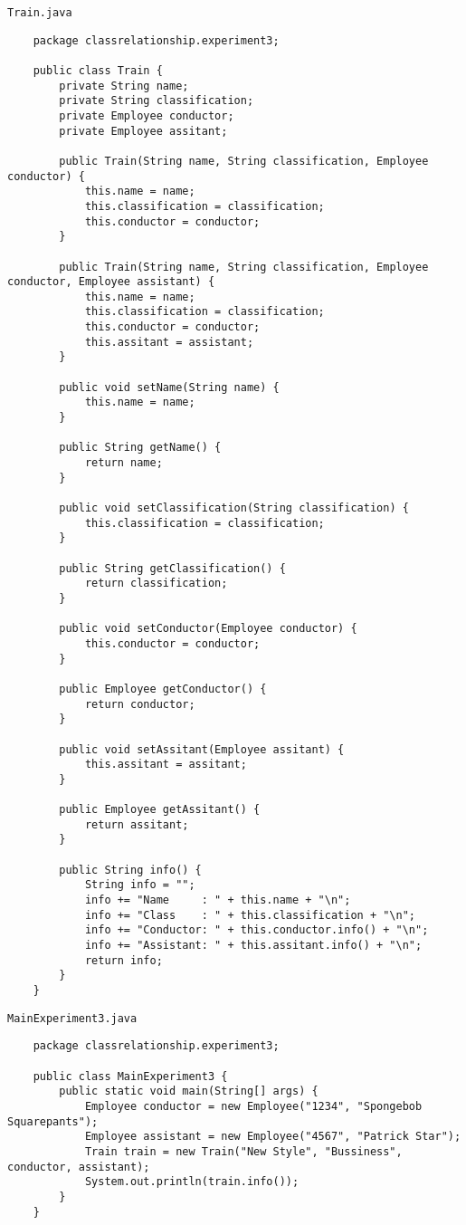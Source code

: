 \documentclass[12pt,titlepage]{article}
\begin{document}
\newpage
\noindent \texttt{Train.java}
\begin{verbatim}
    package classrelationship.experiment3;

    public class Train {
        private String name;
        private String classification;
        private Employee conductor;
        private Employee assitant;

        public Train(String name, String classification, Employee conductor) {
            this.name = name;
            this.classification = classification;
            this.conductor = conductor;
        }

        public Train(String name, String classification, Employee conductor, Employee assistant) {
            this.name = name;
            this.classification = classification;
            this.conductor = conductor;
            this.assitant = assistant;
        }

        public void setName(String name) {
            this.name = name;
        }

        public String getName() {
            return name;
        }

        public void setClassification(String classification) {
            this.classification = classification;
        }

        public String getClassification() {
            return classification;
        }

        public void setConductor(Employee conductor) {
            this.conductor = conductor;
        }

        public Employee getConductor() {
            return conductor;
        }

        public void setAssitant(Employee assitant) {
            this.assitant = assitant;
        }

        public Employee getAssitant() {
            return assitant;
        }

        public String info() {
            String info = "";
            info += "Name     : " + this.name + "\n";
            info += "Class    : " + this.classification + "\n";
            info += "Conductor: " + this.conductor.info() + "\n";
            info += "Assistant: " + this.assitant.info() + "\n";
            return info;
        }
    }
\end{verbatim}

\noindent \texttt{MainExperiment3.java}
\begin{verbatim}
    package classrelationship.experiment3;

    public class MainExperiment3 {
        public static void main(String[] args) {
            Employee conductor = new Employee("1234", "Spongebob Squarepants");
            Employee assistant = new Employee("4567", "Patrick Star");
            Train train = new Train("New Style", "Bussiness", conductor, assistant);
            System.out.println(train.info());
        }
    }
\end{verbatim}
\end{document}
